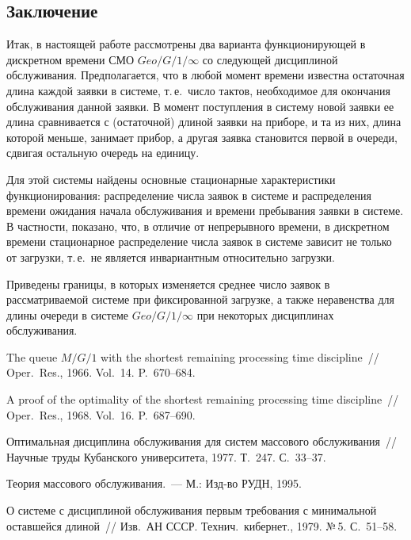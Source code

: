 \begin{multicols}{2}
\section{Заключение}

Итак, в настоящей работе рассмотрены два варианта
функционирующей в дискретном времени СМО
$Geo/G/1/\infty$ со следующей дисциплиной обслуживания.
Предполагается, что в любой момент времени известна остаточная
длина каждой заявки в системе, т.\,е.\ число тактов, необходимое для
окончания обслуживания данной заявки.
В момент поступления в систему новой заявки ее длина сравнивается
с (остаточной) длиной заявки на приборе, и та из них, длина
которой меньше, занимает прибор, а другая заявка становится
первой в очереди, сдвигая остальную очередь на единицу.

Для этой системы найдены основные стационарные характеристики
функционирования: распределение числа заявок в системе и
распределения времени ожидания начала обслуживания и времени
пребывания заявки в системе.
В частности, показано, что, в отличие от непрерывного времени,
в дискретном времени стационарное распределение числа заявок в
системе зависит не только от загрузки, т.\,е.\ не является
инвариантным относительно загрузки.

Приведены границы, в которых изменяется среднее число заявок в
рассматриваемой системе при фиксированной загрузке, а также
неравенства для длины очереди в системе $Geo/G/1/\infty$ при
некоторых дисциплинах обслуживания.

{\small\frenchspacing
{%
\begin{thebibliography}{99}

The queue $M/G/1$ with the shortest
remaining processing time discipline~//
Oper.\ Res., 1966. Vol.~14. P.~670--684.

A proof of the optimality of the shortest remaining
processing time discipline~// Oper.\ Res., 1968. Vol.~16. P.~687--690.

Оптимальная дисциплина обслуживания для систем
массового обслуживания~// Научные труды Кубанского университета,
1977. Т.~247. С.~33--37.

Теория массового обслуживания.~---
М.: Изд-во РУДН, 1995.

О системе с дисциплиной
обслуживания первым требования с минимальной оставшейся длиной~//
Изв.\ АН СССР. Технич.\ кибернет., 1979. №\,5. С.~51--58.


\end{thebibliography}}}
\end{multicols}
